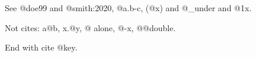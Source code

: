 See @doe99 and @smith:2020, @a.b-c, (@x) and @\_under and @1x.

Not cites: a@b, x.@y, @ alone, @-x, @@double.

End with cite @key.
